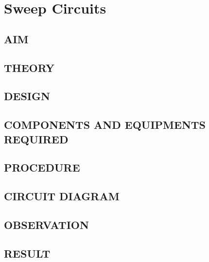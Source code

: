 \chapter[Sweep Circuits]{Sweep Circuits}

\section*{AIM}
\section*{THEORY}
\section*{DESIGN}
\section*{COMPONENTS AND EQUIPMENTS REQUIRED}
\section*{PROCEDURE}
\section*{CIRCUIT DIAGRAM}
\section*{OBSERVATION}
\section*{RESULT}

